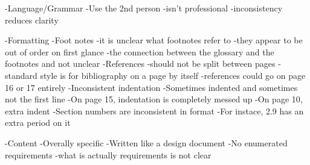 
-Language/Grammar
	-Use the 2nd person
		-isn't professional
		-inconsistency reduces clarity

-Formatting
	-Foot notes
		-it is unclear what footnotes refer to
		-they appear to be out of order on first glance
		-the connection between the glossary and the footnotes and not unclear
	-References
		-should not be split between pages
		-standard style is for bibliography on a page by itself
		-references could go on page 16 or 17 entirely
	-Inconsistent indentation
		-Sometimes indented and sometimes not the first line
		-On page 15, indentation is completely messed up
		-On page 10, extra indent
	-Section numbers are inconsistent in format
		-For instace, 2.9 has an extra period on it
	
-Content
	-Overally specific
	-Written like a design document
	-No enumerated requirements
		-what is actually requirements is not clear


